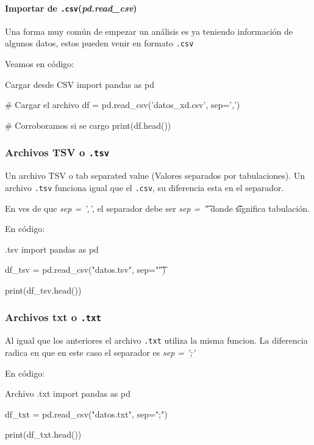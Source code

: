 \paragraph{Importar de \texttt{.csv}(\textit{pd.read\_csv})}

Una forma muy común de empezar un análisis es ya teniendo información de algunos datos, estos pueden venir en formato \texttt{.csv}

Veamos en código:
\begin{pycode}{Cargar desde CSV}
import pandas as pd

# Cargar el archivo
df = pd.read_csv('datos_xd.csv', sep=',')

# Corroboramos si se cargo
print(df.head())
\end{pycode}


\subsubsection{Archivos TSV o \texttt{.tsv}}

Un archivo TSV o tab separated value (Valores separados por tabulaciones). Un archivo \texttt{.tsv} funciona igual que el \texttt{.csv}, su diferencia esta en el separador.

En ves de que \textit{sep = ','}, el separador debe ser \textit{sep = '\t'} donde \t significa tabulación.

En código:
\begin{pycode}{.tsv}
import pandas as pd

df_tsv = pd.read_csv("datos.tsv", sep="\t")

print(df_tsv.head())
\end{pycode} 

\subsubsection{Archivos txt o \texttt{.txt}}
Al igual que los anteriores el archivo \texttt{.txt} utiliza la misma funcion. La diferencia radica en que en este caso el separador es \textit{sep = ';'}

En código:
\begin{pycode}{Archivo .txt}
import pandas as pd

df_txt = pd.read_csv("datos.txt", sep=";")

print(df_txt.head())    
\end{pycode}



